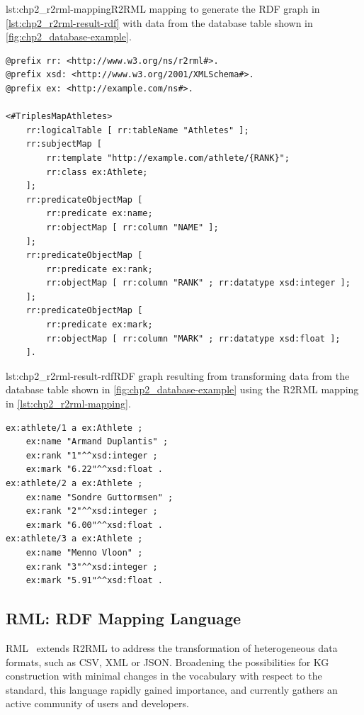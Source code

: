 \begin{captionedlisting}{lst:chp2_r2rml-mapping}{R2RML mapping to generate the RDF graph in \cref{lst:chp2_r2rml-result-rdf} with data from the database table shown in \cref{fig:chp2_database-example}.}
\centering
{\begin{lstlisting}[language=r2rml]
@prefix rr: <http://www.w3.org/ns/r2rml#>.
@prefix xsd: <http://www.w3.org/2001/XMLSchema#>.
@prefix ex: <http://example.com/ns#>.

<#TriplesMapAthletes>
    rr:logicalTable [ rr:tableName "Athletes" ];
    rr:subjectMap [
        rr:template "http://example.com/athlete/{RANK}";
        rr:class ex:Athlete;
    ];
    rr:predicateObjectMap [
        rr:predicate ex:name;
        rr:objectMap [ rr:column "NAME" ];
    ];
    rr:predicateObjectMap [
        rr:predicate ex:rank;
        rr:objectMap [ rr:column "RANK" ; rr:datatype xsd:integer ];
    ];
    rr:predicateObjectMap [
        rr:predicate ex:mark;
        rr:objectMap [ rr:column "MARK" ; rr:datatype xsd:float ];
    ].
\end{lstlisting}}
\end{captionedlisting}

\begin{minipage}{\textwidth}
\begin{captionedlisting}{lst:chp2_r2rml-result-rdf}{RDF graph resulting from transforming data from the database table shown in \cref{fig:chp2_database-example} using the R2RML mapping in \cref{lst:chp2_r2rml-mapping}.}
\centering
\begin{multicols}{2}
{\begin{lstlisting}[language=r2rml]
ex:athlete/1 a ex:Athlete ;
    ex:name "Armand Duplantis" ;
    ex:rank "1"^^xsd:integer ;
    ex:mark "6.22"^^xsd:float .
ex:athlete/2 a ex:Athlete ;
    ex:name "Sondre Guttormsen" ;
    ex:rank "2"^^xsd:integer ;
    ex:mark "6.00"^^xsd:float .
ex:athlete/3 a ex:Athlete ;
    ex:name "Menno Vloon" ;
    ex:rank "3"^^xsd:integer ;
    ex:mark "5.91"^^xsd:float .
\end{lstlisting}}
\end{multicols}
\end{captionedlisting}
\end{minipage}



 
\subsection{RML: RDF Mapping Language}
\label{sec:chp2_RML}
RML~\parencite{Dimou2014rml} extends R2RML to address the transformation of heterogeneous data formats, such as CSV, XML or JSON. Broadening the possibilities for KG construction with minimal changes in the vocabulary with respect to the standard, this language rapidly gained importance, and currently gathers an active community of users and developers. 


